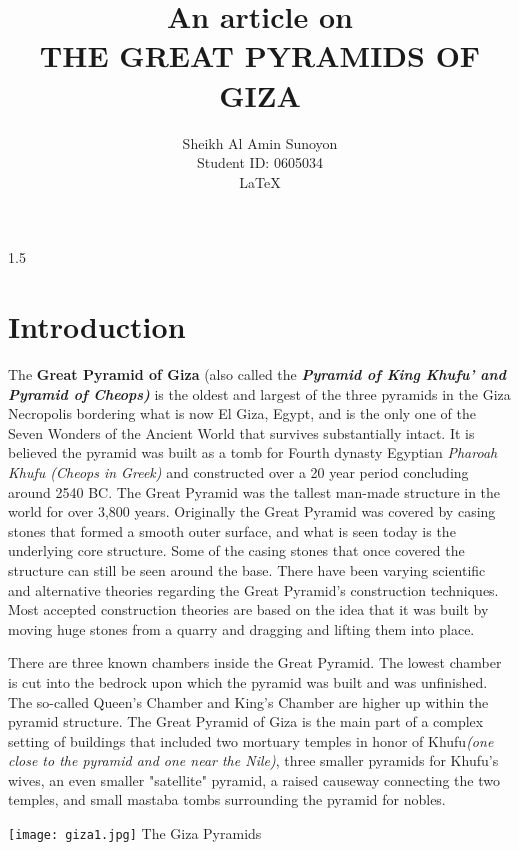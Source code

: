 \documentclass[12 pt]{article}
\author{Sheikh Al Amin Sunoyon\\ Student ID: 0605034\\ \LaTeX}
\title{{An article on}\\ \textbf{\Huge{THE GREAT PYRAMIDS OF GIZA}}}
\date{}
\begin{document}
\maketitle

\newpage
\tableofcontents
\newpage
\setlength{\baselineskip}
{1.5\baselineskip}
\section{Introduction}
The {\bfseries Great Pyramid of Giza} (also called the {\bfseries \itshape Pyramid of King Khufu' and Pyramid of Cheops)} is the oldest and largest of the three pyramids in the Giza Necropolis bordering what is now El Giza, Egypt, and is the only one of the Seven Wonders of the Ancient World that survives substantially intact. It is believed the pyramid was built as a tomb for Fourth dynasty Egyptian {\itshape Pharoah Khufu (Cheops in Greek)} and constructed over a 20 year period concluding around 2540 BC. The Great Pyramid was the tallest man-made structure in the world for over 3,800 years. Originally the Great Pyramid was covered by casing stones that formed a smooth outer surface, and what is seen today is the underlying core structure. Some of the casing stones that once covered the structure can still be seen around the base. There have been varying scientific and alternative theories regarding the Great Pyramid's construction techniques. Most accepted construction theories are based on the idea that it was built by moving huge stones from a quarry and dragging and lifting them into place.

There are three known chambers inside the Great Pyramid. The lowest chamber is cut into the bedrock upon which the pyramid was built and was unfinished. The so-called Queen's Chamber and King's Chamber are higher up within the pyramid structure. The Great Pyramid of Giza is the main part of a complex setting of buildings that included two mortuary temples in honor of Khufu{\itshape (one close to the pyramid and one near the  Nile)}, three smaller pyramids for Khufu's wives, an even smaller "satellite" pyramid, a raised causeway connecting the two temples, and small mastaba tombs surrounding the pyramid for nobles.

\newpage

\begin{center}
\texttt{[image: giza1.jpg]}
\newline The Giza Pyramids\newline
\end{center}
\end{document}

